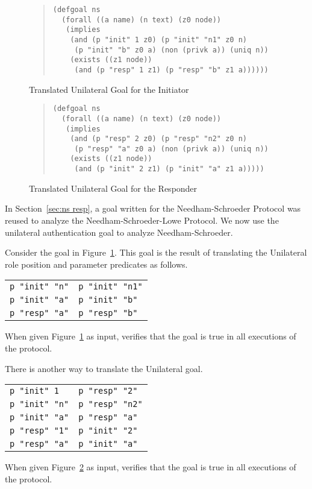 \documentclass[12pt]{article}
\begin{document}
\begin{figure}
\begin{quote}
\begin{verbatim}
(defgoal ns
  (forall ((a name) (n text) (z0 node))
   (implies
    (and (p "init" 1 z0) (p "init" "n1" z0 n)
     (p "init" "b" z0 a) (non (privk a)) (uniq n))
    (exists ((z1 node))
     (and (p "resp" 1 z1) (p "resp" "b" z1 a))))))
\end{verbatim}
\end{quote}
\caption{Translated Unilateral Goal for the
  Initiator}\label{fig:unilateral ns init}
\end{figure}

\begin{figure}
\begin{quote}
\begin{verbatim}
(defgoal ns
  (forall ((a name) (n text) (z0 node))
   (implies
    (and (p "resp" 2 z0) (p "resp" "n2" z0 n)
     (p "resp" "a" z0 a) (non (privk a)) (uniq n))
    (exists ((z1 node))
     (and (p "init" 2 z1) (p "init" "a" z1 a)))))
\end{verbatim}
\end{quote}
\caption{Translated Unilateral Goal for the
  Responder}\label{fig:unilateral ns resp}
\end{figure}

In Section~\ref{sec:ns resp}, a goal written for the Needham-Schroeder
Protocol was reused to analyze the Needham-Schroeder-Lowe Protocol.
We now use the unilateral authentication goal to analyze
Needham-Schroeder.

Consider the goal in Figure~\ref{fig:unilateral ns init}.  This goal
is the result of translating the Unilateral role position and
parameter predicates as follows.
\begin{center}
\begin{tabular}{l@{$\quad\rightarrow\quad$}l}
  \texttt{p "init" "n"}&\texttt{p "init" "n1"}\\
  \texttt{p "init" "a"}&\texttt{p "init" "b"}\\
  \texttt{p "resp" "a"}&\texttt{p "resp" "b"}
\end{tabular}
\end{center}
When given Figure~\ref{fig:unilateral ns init} as input, {\cpsa}
verifies that the goal is true in all executions of the protocol.

There is another way to translate the Unilateral goal.
\begin{center}
\begin{tabular}{l@{$\quad\rightarrow\quad$}l}
  \texttt{p "init" 1}&\texttt{p "resp" "2"}\\
  \texttt{p "init" "n"}&\texttt{p "resp" "n2"}\\
  \texttt{p "init" "a"}&\texttt{p "resp" "a"}\\
  \texttt{p "resp" "1"}&\texttt{p "init" "2"}\\
  \texttt{p "resp" "a"}&\texttt{p "init" "a"}
\end{tabular}
\end{center}
When given Figure~\ref{fig:unilateral ns resp} as input, {\cpsa}
verifies that the goal is true in all executions of the protocol.
\end{document}
